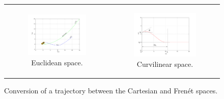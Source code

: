 \begin{figure}[h!]
\centering
\begin{tabular}{cc}
  \begin{subfigure}[b]{0.45\textwidth}
      \centering
      \includegraphics[width=\textwidth, trim=50 30 80 60,clip]{justOneCartesian45}
      \caption{Euclidean space.}
      \label{fig:cp07_justOneCartesian45}
  \end{subfigure} &
  \begin{subfigure}[b]{0.45\textwidth}
    \centering
    \includegraphics[width=\textwidth, trim=50 30 80 60,clip]{justOneFrenet45}
    \caption{Curvilinear space.}
    \label{fig:cp07_justOneFrenet45}
  \end{subfigure}%
\end{tabular}
\caption{Conversion of a trajectory between the Cartesian and Frenét spaces.}\label{fig:cp07_euclidean_frenet_conversion}
\end{figure}

